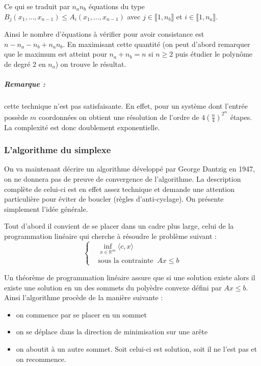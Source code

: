 \documentclass[10pt,a4paper]{article}
\begin{document}
Ce qui se traduit par $n_an_b$ équations du type $B_j(x_1,\dots,x_{n-1}) \le A_i(x_1,\dots,x_{n-1})$ avec $j \in \llbracket 1,n_b \rrbracket$ et $i \in \llbracket 1,n_a \rrbracket$.

Ainsi le nombre d'équations à vérifier pour avoir consistance est $n-n_a-n_b+n_an_b$. En maximisant cette quantité (on peut d'abord remarquer que le maximum est atteint pour $n_a+n_b=n$ si $n \ge 2$ puis étudier le polynôme de degré 2 en $n_a$) on trouve le résultat.

\subparagraph{Remarque :} cette technique n'est pas satisfaisante. En effet, pour un système dont l'entrée possède $m$ coordonnées on obtient une résolution de l'ordre de $4 \left( \frac{n}{4} \right)^{2^m}$ étapes. La complexité est donc doublement exponentielle.

\subsubsection{L'algorithme du simplexe}
On va maintenant décrire un algorithme développé par George Dantzig en 1947, on ne donnera pas de preuve de convergence de l'algorithme. La description complète de celui-ci est en effet assez technique et demande une attention particulière pour éviter de boucler (règles d'anti-cyclage). On présente simplement l'idée générale.

Tout d'abord il convient de se placer dans un cadre plus large, celui de la programmation linéaire qui cherche à résoudre le problème suivant :
\begin{equation}
\left\lbrace
\begin{aligned}
&\underset{x \in \mathbb{R}^m}{\inf}\langle c,x \rangle \\
& \text{sous la contrainte } \ Ax \le b
\end{aligned}
\right.
\end{equation}

Un théorème de programmation linéaire assure que si une solution existe alors il existe une solution en un des sommets du polyèdre convexe défini par $Ax \le b$. Ainsi l'algorithme procède de la manière suivante :
\begin{itemize}
\item on commence par se placer en un sommet
\item on se déplace dans la direction de minimisation sur une arête
\item on aboutit à un autre sommet. Soit celui-ci est solution, soit il ne l'est pas et on recommence.
\end{itemize}
\end{document}
